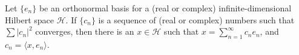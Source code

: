 \documentclass[12pt]{article}
\theoremstyle{plain}
\begin{document}
Let $\{e_n\}$ be an orthonormal basis for a (real or complex) infinite-dimensional Hilbert space $\mathcal{H}$. If $\{c_n\}$ is a sequence of (real or complex) numbers such that $\sum \lvert c_n \lvert^2$ converges, then there is an $x\in \mathcal{H}$ such that $x=\sum_{n=1}^{\infty} c_n e_n$, and $c_n = \langle x,e_n \rangle$.
\end{document}
